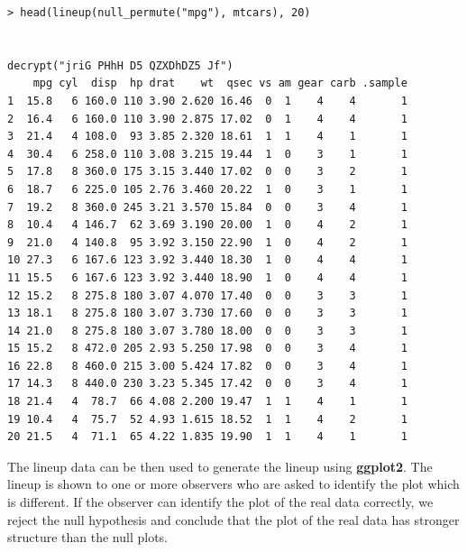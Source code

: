 \documentclass[article]{jss}
\begin{document}
\begin{verbatim}
> head(lineup(null_permute("mpg"), mtcars), 20)


decrypt("jriG PHhH D5 QZXDhDZ5 Jf")
    mpg cyl  disp  hp drat    wt  qsec vs am gear carb .sample
1  15.8   6 160.0 110 3.90 2.620 16.46  0  1    4    4       1
2  16.4   6 160.0 110 3.90 2.875 17.02  0  1    4    4       1
3  21.4   4 108.0  93 3.85 2.320 18.61  1  1    4    1       1
4  30.4   6 258.0 110 3.08 3.215 19.44  1  0    3    1       1
5  17.8   8 360.0 175 3.15 3.440 17.02  0  0    3    2       1
6  18.7   6 225.0 105 2.76 3.460 20.22  1  0    3    1       1
7  19.2   8 360.0 245 3.21 3.570 15.84  0  0    3    4       1
8  10.4   4 146.7  62 3.69 3.190 20.00  1  0    4    2       1
9  21.0   4 140.8  95 3.92 3.150 22.90  1  0    4    2       1
10 27.3   6 167.6 123 3.92 3.440 18.30  1  0    4    4       1
11 15.5   6 167.6 123 3.92 3.440 18.90  1  0    4    4       1
12 15.2   8 275.8 180 3.07 4.070 17.40  0  0    3    3       1
13 18.1   8 275.8 180 3.07 3.730 17.60  0  0    3    3       1
14 21.0   8 275.8 180 3.07 3.780 18.00  0  0    3    3       1
15 15.2   8 472.0 205 2.93 5.250 17.98  0  0    3    4       1
16 22.8   8 460.0 215 3.00 5.424 17.82  0  0    3    4       1
17 14.3   8 440.0 230 3.23 5.345 17.42  0  0    3    4       1
18 21.4   4  78.7  66 4.08 2.200 19.47  1  1    4    1       1
19 10.4   4  75.7  52 4.93 1.615 18.52  1  1    4    2       1
20 21.5   4  71.1  65 4.22 1.835 19.90  1  1    4    1       1

\end{verbatim}

The lineup data can be then used to generate the lineup using
\textbf{ggplot2}. The lineup is shown to one or more observers who are
asked to identify the plot which is different. If the observer can
identify the plot of the real data correctly, we reject the null
hypothesis and conclude that the plot of the real data has stronger
structure than the null plots. 

%
\end{document}
